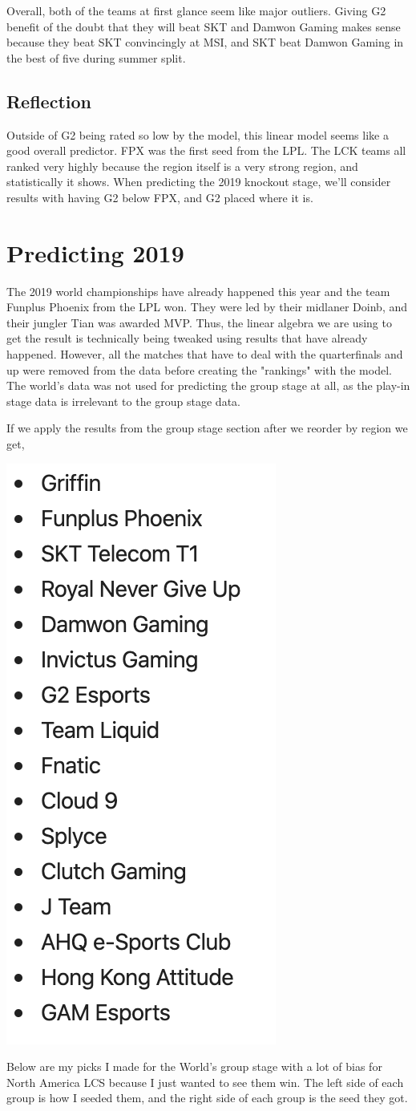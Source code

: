 \documentclass[11pt]{article}
\theoremstyle{plain}
\theoremstyle{definition}
\numberwithin{equation}{section}
\numberwithin{theorem}{section}
\numberwithin{lemma}{section}
\numberwithin{definition}{section}
\numberwithin{proposition}{section}
\numberwithin{corollary}{section}
\begin{document}
	
	Overall, both of the teams at first glance seem like major outliers. Giving G2 benefit of the doubt that they will beat SKT and Damwon Gaming makes sense because they beat SKT convincingly at MSI, and SKT beat Damwon Gaming in the best of five during summer split. 
	
\subsection{Reflection}
	Outside of G2 being rated so low by the model, this linear model seems like a good overall predictor. FPX was the first seed from the LPL. The LCK teams all ranked very highly because the region itself is a very strong region, and statistically it shows. When predicting the 2019 knockout stage, we'll consider results with having G2 below FPX, and G2 placed where it is.
	

\section{Predicting 2019}
	The 2019 world championships have already happened this year and the team Funplus Phoenix from the LPL won. They were led by their midlaner Doinb, and their jungler Tian was awarded MVP. Thus, the linear algebra we are using to get the result is technically being tweaked using results that have already happened. However, all the matches that have to deal with the quarterfinals and up were removed from the data before creating the "rankings" with the model. The world's data was not used for predicting the group stage at all, as the play-in stage data is irrelevant to the group stage data.
	
	
	If we apply the results from the group stage section after we reorder by region we get,
	\begin{center}
		\includegraphics[width=.75in]{Ranking}
	\end{center}
	 
	 Below are my picks I made for the World's group stage with a lot of bias for North America LCS because I just wanted to see them win. The left side of each group is how I seeded them, and the right side of each group is the seed they got.
	 
\end{document}
